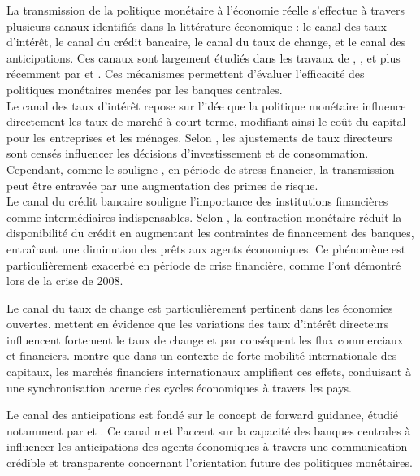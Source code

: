 La transmission de la politique monétaire à l'économie réelle s'effectue à travers plusieurs canaux identifiés dans la littérature économique : le canal des taux d'intérêt, le canal du crédit bancaire, le canal du taux de change, et le canal des anticipations. Ces canaux sont largement étudiés dans les travaux de \citep{bernanke1995}, \citep{mishkin1996}, \citep{mishkin2001} et plus récemment par \citep{gertler2015} et \citep{boivin2010}. Ces mécanismes permettent d'évaluer l'efficacité des politiques monétaires menées par les banques centrales.\\

Le canal des taux d'intérêt repose sur l'idée que la politique monétaire influence directement les taux de marché à court terme, modifiant ainsi le coût du capital pour les entreprises et les ménages. Selon \citep{clarida2000}, les ajustements de taux directeurs sont censés influencer les décisions d'investissement et de consommation. Cependant, comme le souligne \citep{adrian2010}, en période de stress financier, la transmission peut être entravée par une augmentation des primes de risque.\\

Le canal du crédit bancaire souligne l’importance des institutions financières comme intermédiaires indispensables. Selon \citep{kashyap2000}, la contraction monétaire réduit la disponibilité du crédit en augmentant les contraintes de financement des banques, entraînant une diminution des prêts aux agents économiques. Ce phénomène est particulièrement exacerbé en période de crise financière, comme l'ont démontré \citep{ivashina2010} lors de la crise de 2008.

Le canal du taux de change est particulièrement pertinent dans les économies ouvertes. \citep{obstfeld2005} mettent en évidence que les variations des taux d'intérêt directeurs influencent fortement le taux de change et par conséquent les flux commerciaux et financiers. \citep{rey2015} montre que dans un contexte de forte mobilité internationale des capitaux, les marchés financiers internationaux amplifient ces effets, conduisant à une synchronisation accrue des cycles économiques à travers les pays.

Le canal des anticipations est fondé sur le concept de forward guidance, étudié notamment par \citep{woodford2012} et \citep{delnegro2015}. Ce canal met l'accent sur la capacité des banques centrales à influencer les anticipations des agents économiques à travers une communication crédible et transparente concernant l'orientation future des politiques monétaires.

